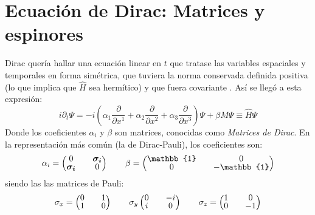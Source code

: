 \section{Ecuación de Dirac: Matrices y espinores}\label{cap:Dirac}
Dirac quería hallar una ecuación linear en $t$ que tratase las variables espaciales y temporales en forma simétrica, que tuviera la norma conservada definida positiva (lo que implica que $\widehat{H}$ sea hermítico) y que fuera covariante \cite{MCR}. Así se llegó a esta expresión:
\begin{equation}
i\partial _{t}\Psi =-i\left( \alpha _{1}\dfrac{\partial }{\partial x^{1}}+\alpha _{2}\dfrac{\partial }{\partial x^{2}} + \alpha _{3}\dfrac{\partial }{\partial x^{3}}\right) \Psi +\beta M\Psi \equiv\widehat{H}\Psi \label{eq:Dirac}
\end{equation}
Donde los coeficientes $\alpha_i$ y $\beta$ son matrices, conocidas como \textit{Matrices de Dirac}. En la representación más común (la de Dirac-Pauli), los coeficientes son:
\begin{align*}
\alpha _{i}=
\begingroup 
\renewcommand*{\arraystretch}{0.8}
\setlength\arraycolsep{10pt}
\begin{pmatrix} 
0 & \boldsymbol{\sigma_{i}} \\ \boldsymbol{\sigma_{i}} & 0 \end{pmatrix} \qquad
\beta =\begin{pmatrix} \mathbb{1} & 0 \\ 0 & -\mathbb{1} \end{pmatrix}
\endgroup
\end{align*}
siendo las  las matrices de Pauli:
\begin{align*}
\sigma _{x}=
\begingroup 
\renewcommand*{\arraystretch}{0.8}
\setlength\arraycolsep{10pt}
\begin{pmatrix} 
0 & 1 \\ 1 & 0 \end{pmatrix} \qquad \sigma_y
\begin{pmatrix} 
0 & -i \\ i & 0 \end{pmatrix} \qquad
\sigma_z =\begin{pmatrix} 1 & 0 \\ 0 & -1 \end{pmatrix}
\endgroup
\end{align*}

